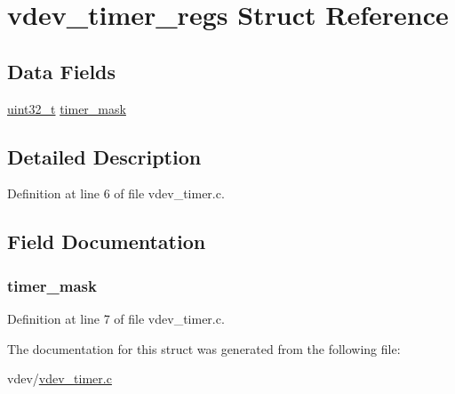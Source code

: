 \hypertarget{structvdev__timer__regs}{\section{vdev\-\_\-timer\-\_\-regs \-Struct \-Reference}
\label{structvdev__timer__regs}
}
\subsection*{\-Data \-Fields}
\begin{DoxyCompactItemize}
\item 
\hyperlink{arch__types_8h_a435d1572bf3f880d55459d9805097f62}{uint32\-\_\-t} \hyperlink{structvdev__timer__regs_af8ddab8974b6cd490b5047348139379c}{timer\-\_\-mask}
\end{DoxyCompactItemize}


\subsection{\-Detailed \-Description}


\-Definition at line 6 of file vdev\-\_\-timer.\-c.



\subsection{\-Field \-Documentation}
\hypertarget{structvdev__timer__regs_af8ddab8974b6cd490b5047348139379c}{
\subsubsection[{timer\-\_\-mask}]{ {\bf timer\-\_\-mask}}}\label{structvdev__timer__regs_af8ddab8974b6cd490b5047348139379c}


\-Definition at line 7 of file vdev\-\_\-timer.\-c.



\-The documentation for this struct was generated from the following file\-:\begin{DoxyCompactItemize}
\item 
vdev/\hyperlink{vdev__timer_8c}{vdev\-\_\-timer.\-c}\end{DoxyCompactItemize}

